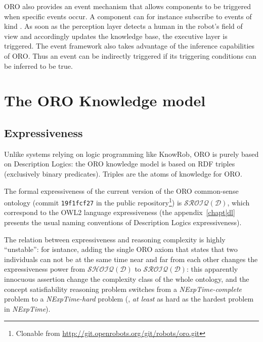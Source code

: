 ORO also provides an event mechanism that allows components to be triggered
when specific events occur. A component can for instance subscribe to events
of kind . As soon as the
perception layer detects a human in the robot's field of view and accordingly
updates the knowledge base, the executive layer is triggered. The event
framework also takes advantage of the inference capabilities of ORO. Thus an
event can be indirectly triggered if its triggering conditions can be
inferred to be true.




\section{The ORO Knowledge model}
\label{sect|knowledge-model}

\subsection{Expressiveness}

Unlike systems relying on logic programming like {\sc KnowRob}, ORO is purely
based on Description Logics: the ORO knowledge model is based on RDF triples
(\ie exclusively binary predicates). Triples 
are the atoms of knowledge for ORO.

The formal expressiveness of the current version of the ORO common-sense
ontology (commit {\tt 19f1fcf27} in the public repository\footnote{Clonable
from \url{http://git.openrobots.org/git/robots/oro.git}}) is
$\mathcal{SROIQ(D)}$, which correspond to the OWL2 language expressiveness (the
appendix~\ref{chapt|dl} presents the usual naming conventions of Description
Logics expressiveness).

The relation between expressiveness and reasoning complexity is highly
``unstable'': for isntance, adding  the single ORO axiom  that states that two individuals can not be at the same
time near and far from each other changes the expressiveness power from
$\mathcal{SHOIQ(D)}$ to $\mathcal{SROIQ(D)}$: this apparently innocuous
assertion change the complexity class of the whole ontology, and the concept
satisfiability reasoning problem switches from a {\it NExpTime-complete}
problem to a {\it NExpTime-hard} problem (\ie, \emph{at least} as hard as the
hardest problem in {\it NExpTime}).

